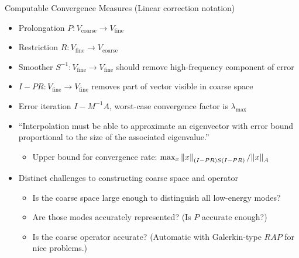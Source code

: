 \begin{frame}{Computable Convergence Measures (Linear correction notation)}
\newcommand\Vcoarse{V_{\text{coarse}}}
\newcommand\Vfine{V_{\text{fine}}}
  \begin{itemize}
  \item Prolongation $P: \Vcoarse \to \Vfine$
  \item Restriction $R: \Vfine \to \Vcoarse$
  \item Smoother $S^{-1} : \Vfine \to \Vfine$ should remove high-frequency component of error
  \item $I - PR: \Vfine \to \Vfine$ removes part of vector visible in coarse space
  \item Error iteration $I - M^{-1}A$, worst-case convergence factor is $\lambda_{\max}$
  \item ``Interpolation must be able to approximate an eigenvector with error bound proportional to the size of the associated eigenvalue.''
    \begin{itemize}
    \item Upper bound for convergence rate: $\max_x \left\lVert x \right\rVert_{(I-PR)S(I-PR)}/{\left\lVert x \right\rVert_A}$
    \end{itemize}
  \item Distinct challenges to constructing coarse space and operator
    \begin{itemize}
    \item Is the coarse space large enough to distinguish all low-energy modes?
    \item Are those modes accurately represented? (Is $P$ accurate enough?)
    \item Is the coarse operator accurate? (Automatic with Galerkin-type $RAP$ for nice problems.)
    \end{itemize}
  \end{itemize}
\end{frame}
